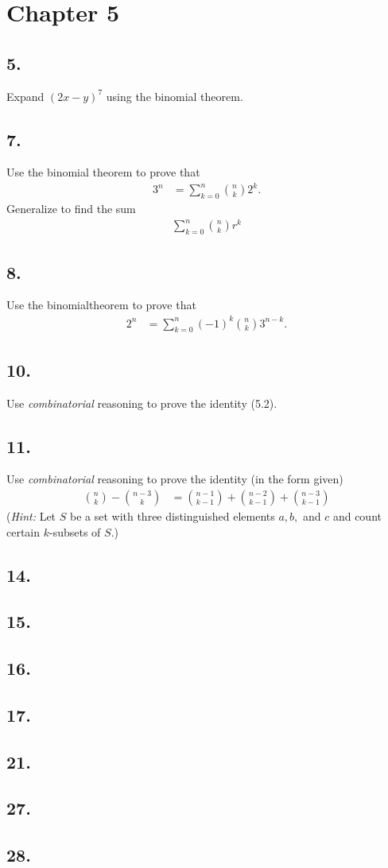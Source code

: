 \documentclass{article}
\begin{document}
\section*{Chapter 5}
\subsection*{5.}
Expand $(2x-y)^7$ using the binomial theorem.
\subsection*{7.}
Use the binomial theorem to prove that
\begin{align*}
  3^n&=\sum\limits_{k=0}^n{\binom{n}{k}2^k}.
\end{align*}
Generalize to find the sum
\begin{align*}
  \sum\limits_{k=0}^n{\binom{n}{k}r^k}
\end{align*}
\subsection*{8.}
Use the binomialtheorem to prove that
\begin{align*}
  2^n&=\sum\limits_{k=0}^n{(-1)^k\binom{n}{k}3^{n-k}}.
\end{align*}
\subsection*{10.}
Use \emph{combinatorial} reasoning to prove the identity (5.2).
\subsection*{11.}
Use \emph{combinatorial} reasoning to prove the identity (in the form given)
\begin{align*}
  \binom{n}{k}-\binom{n-3}{k}&=\binom{n-1}{k-1}+\binom{n-2}{k-1}+\binom{n-3}{k-1}
\end{align*}
(\emph{Hint:} Let $S$ be a set with three distinguished elements $a, b,$ and $c$ and count certain $k$-subsets of $S$.)
\subsection*{14.}
\subsection*{15.}
\subsection*{16.}
\subsection*{17.}
\subsection*{21.}
\subsection*{27.}
\subsection*{28.}
\end{document}
